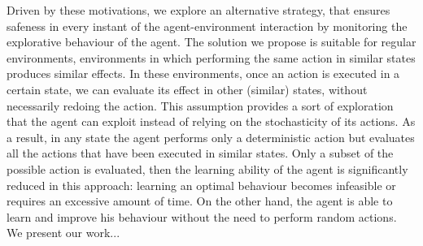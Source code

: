 Driven by these motivations, we explore an alternative strategy, that ensures safeness in every instant of the agent-environment interaction by monitoring the explorative behaviour of the agent. The solution we propose is suitable for regular environments, \ie environments in which performing the same action in similar states produces similar effects. In these environments, once an action is executed in a certain state, we can evaluate its effect in other (similar) states, without necessarily redoing the action. This assumption provides a sort of exploration that the agent can exploit instead of relying on the stochasticity of its actions. As a result, in any state the agent performs only a deterministic action but evaluates all the actions that have been executed in similar states. Only a subset of the possible action is evaluated, then the learning ability of the agent is significantly reduced in this approach: learning an optimal behaviour becomes infeasible or requires an excessive amount of time. On the other hand, the agent is able to learn and improve his behaviour without the need to perform random actions.\\
\newline
We present our work... 